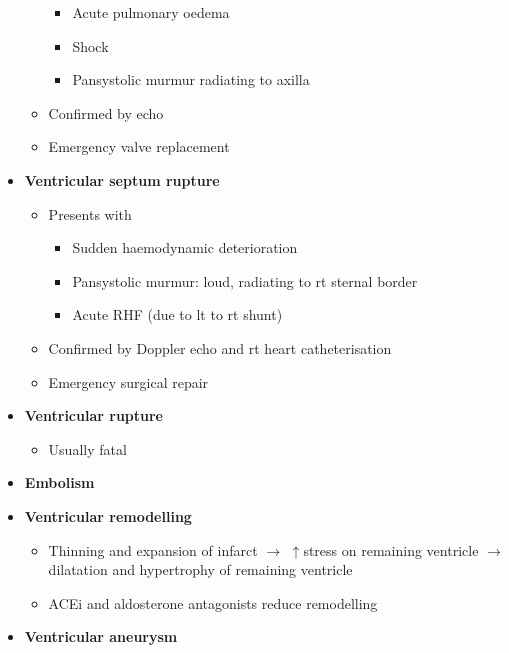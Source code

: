 \documentclass[
  12pt,
]{memoir}
\providecommand{\tightlist}{%
  \setlength{\itemsep}{0pt}\setlength{\parskip}{0pt}}
\begin{document}
\begin{itemize}
\begin{itemize}
    \begin{itemize}
    \tightlist
    \item
      Acute pulmonary oedema
    \item
      Shock
    \item
      Pansystolic murmur radiating to axilla
    \end{itemize}
  \item
    Confirmed by echo
  \item
    Emergency valve replacement
  \end{itemize}
\item
  \textbf{Ventricular septum rupture}

  \begin{itemize}
  \tightlist
  \item
    Presents with

    \begin{itemize}
    \tightlist
    \item
      Sudden haemodynamic deterioration
    \item
      Pansystolic murmur: loud, radiating to rt sternal border
    \item
      Acute RHF (due to lt to rt shunt)
    \end{itemize}
  \item
    Confirmed by Doppler echo and rt heart catheterisation
  \item
    Emergency surgical repair
  \end{itemize}
\item
  \textbf{Ventricular rupture}

  \begin{itemize}
  \tightlist
  \item
    Usually fatal
  \end{itemize}
\item
  \textbf{Embolism}
\item
  \textbf{Ventricular remodelling}

  \begin{itemize}
  \tightlist
  \item
    Thinning and expansion of infarct \(\rightarrow\) \(\uparrow\)stress
    on remaining ventricle \(\rightarrow\) dilatation and hypertrophy of
    remaining ventricle
  \item
    ACEi and aldosterone antagonists reduce remodelling
  \end{itemize}
\item
  \textbf{Ventricular aneurysm}
\end{itemize}
\end{document}
